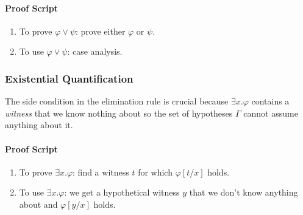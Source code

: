 \documentclass{amsart}
\begin{document}
\paragraph{Proof Script}
\begin{enumerate}
\item To prove $\varphi \vee \psi$: prove either $\varphi$ or $\psi$.
\item To use $\varphi \vee \psi$: case analysis.
\end{enumerate}

\subsubsection{Existential Quantification}
\label{sec:existential-quantification}

The side condition in the elimination rule is crucial because $\exists x.\varphi$ contains a \emph{witness} that we know nothing about so the set of hypotheses $\Gamma$ cannot assume anything about it.

\paragraph{Proof Script}
\begin{enumerate}
\item To prove $\exists x.\varphi$: find a witness $t$ for which $\varphi[t/x]$ holds.
\item To use $\exists x.\varphi$: we get a hypothetical witness $y$ that we don't know anything about and $\varphi[y/x]$ holds.
\end{enumerate}
\end{document}
